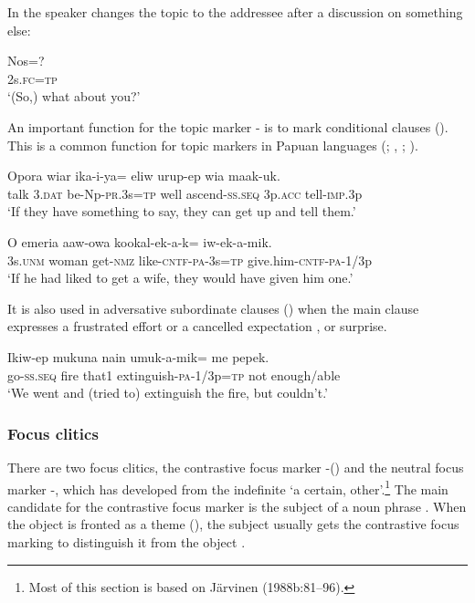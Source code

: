In  the speaker changes the topic to the addressee after a discussion on something else:

\ea%
\label{ex:3:x780}
\gll Nos=? \\
2s.\textsc{fc}=\textsc{tp}\\
\glt`(So,) what about you?'
\z

An important function for the topic marker - is to mark conditional clauses (). This is a common function for topic markers in Papuan languages (\citealt{Haiman1978}; \citealt{Reesink1983b}, \citeyear[242]{Reesink1987}; \citealt[203]{Foley1986}).

\ea%
\label{ex:3:x744}
\gll Opora wiar ika-i-ya= eliw urup-ep wia maak-uk.\\
talk 3.\textsc{dat} be-Np-\textsc{pr}.3s=\textsc{tp} well ascend-\textsc{ss}.\textsc{seq} 3p.\textsc{acc} tell-\textsc{imp}.3p\\
\glt`If they have something to say, they can get up and tell them.'
\z

\ea%
\label{ex:3:x745}
\gll O emeria aaw-owa kookal-ek-a-k= iw-ek-a-mik.\\
3s.\textsc{unm} woman get-\textsc{nmz} like-\textsc{cntf}-\textsc{pa}-3s=\textsc{tp} give.him-\textsc{cntf}-\textsc{pa}-1/3p\\
\glt`If he had liked to get a wife, they would have given him one.'
\z

It is also used in adversative subordinate clauses () when the main clause expresses a frustrated effort or a cancelled expectation , or surprise.

\ea%
\label{ex:3:x1399}
\gll Ikiw-ep mukuna nain umuk-a-mik= me pepek. \\
go-\textsc{ss}.\textsc{seq} fire that1 extinguish-\textsc{pa}-1/3p=\textsc{tp} not enough/able\\
\glt`We went and (tried to) extinguish the fire, but couldn't.'
\z

\subsubsection{Focus clitics}\label{sec:3.12.7.2}
{}
There are two focus clitics, the contrastive focus marker -() and the neutral focus marker -, which has developed from the indefinite  `a certain, other'.\footnote{Most of this section is based on J\"arvinen (1988b:81--96).} The main candidate for the contrastive focus marker is the subject of a noun phrase . When the object is fronted as a theme (), the subject usually gets the contrastive focus marking to distinguish it from the object . 

